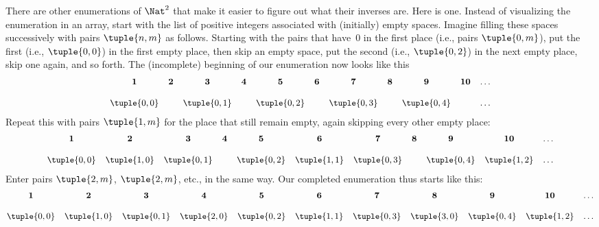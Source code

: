 \documentclass[../../../include/open-logic-section]{subfiles}
\begin{document}


\begin{explain}
There are other enumerations of $\Nat^2$ that make it easier to
figure out what their inverses are. Here is one. Instead of
visualizing the enumeration in an array, start with the list of
positive integers associated with (initially) empty spaces. Imagine
filling these spaces successively with pairs $\tuple{n,m}$ as follows.
Starting with the pairs that have~$0$ in  the first place (i.e., pairs
$\tuple{0,m}$), put the first (i.e., $\tuple{0,0}$) in the first empty
place, then skip an empty space, put the second (i.e., $\tuple{0,2}$)
in the next empty place, skip one again, and so forth. The
(incomplete) beginning of our enumeration now looks like this
\[\small
\begin{array}{@{}c c c c c c c c c c c@{}}
\mathbf 1 & \mathbf 2 & \mathbf 3 & \mathbf 4 & \mathbf 5 & \mathbf 6 & \mathbf 7 & \mathbf 8 & \mathbf 9 & \mathbf{10} & \dots \\ \\
\tuple{0,0} &  & \tuple{0,1} &  & \tuple{0,2} &  & \tuple{0,3} & & \tuple{0,4} &  & \dots \\
\end{array}
\]
Repeat this with pairs $\tuple{1,m}$ for the place that still remain
empty, again skipping every other empty place:
\[\small
\begin{array}{@{}c c c c c c c c c c c@{}}
\mathbf 1 & \mathbf 2 & \mathbf 3 & \mathbf 4 & \mathbf 5 & \mathbf 6 & \mathbf 7 & \mathbf 8 & \mathbf 9 & \mathbf{10} & \dots \\ \\
\tuple{0,0} & \tuple{1,0} & \tuple{0,1} &  & \tuple{0,2} & \tuple{1,1} & 
\tuple{0,3} & & \tuple{0,4} &  \tuple{1,2} & \dots \\
\end{array}
\]
Enter pairs $\tuple{2,m}$, $\tuple{2,m}$, etc., in the same way. Our
completed enumeration thus starts like this:
\[\small
\begin{array}{@{}cc c c c c c c c c c@{}}
\mathbf 1 & \mathbf 2 & \mathbf 3 & \mathbf 4 & \mathbf 5 & \mathbf 6 & \mathbf 7 & \mathbf 8 & \mathbf 9 & \mathbf{10} & \dots \\ \\
\tuple{0,0} & \tuple{1,0} & \tuple{0,1} & \tuple{2,0}  & \tuple{0,2} & 
\tuple{1,1} & \tuple{0,3} & \tuple{3,0}  & \tuple{0,4} &  \tuple{1,2} & \dots \\

\end{array}\]
\end{explain}
\end{document}

